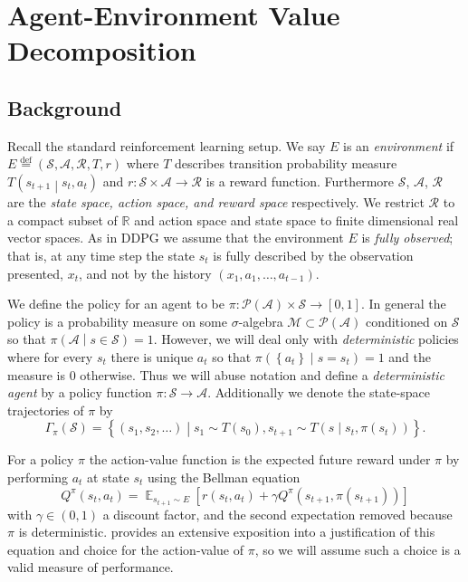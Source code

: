 \documentclass{article} %
\numberwithin{equation}{subsection}
\numberwithin{theorem}{subsection}
\def\expect{\mathop{{\mathbb{E}}}}
\newcommand{\set}[1]{ \left\{ #1 \right\} }
\def\suchthat{\mathrel{}\middle|\mathrel{}}
\def\defeq{\stackrel{\text{def}}{=}}
\def\scriptm{{\mathcal M}}
\def\scripta{{\mathcal A}}
\def\scriptr{{\mathcal R}}
\def\scriptp{{\mathcal P}}
\def\scripts{{\mathcal S}}
\begin{document}
\section{Agent-Environment Value Decomposition}


\subsection{Background}
Recall the standard reinforcement learning setup. We say $E$ is an \emph{environment} if $E \defeq (\scripts, \scripta, \scriptr, T, r)$ where $T$ describes transition probability measure $T\left(s_{t+1}\suchthat s_t, a_t\right)$ and $r: \scripts \times \scripta \to \scriptr$ is a reward function. Furthermore $\scripts$, $\scripta$, $\scriptr$ are the \emph{state space, action space, and reward space} respectively. We restrict $\scriptr$ to a compact subset of $\mathbb{R}$ and action space and state space to finite dimensional real vector spaces. As in DDPG we assume that the environment $E$ is \emph{fully observed}; that is, at any time step the state $s_t$ is fully described by the observation presented, $x_t$, and not by the history $(x_1, a_1, \dots, a_{t-1}).$

We define the policy for an agent to be $\pi: \scriptp(\scripta) \times \scripts \to [0,1]$. In general the policy is a probability measure on some $\sigma$-algebra $\scriptm \subset \scriptp(\scripta)$ conditioned on $\scripts$ so that $\pi\left(\scripta \suchthat s \in \scripts\right) = 1$. However, we will deal only with \emph{deterministic} policies where for every $s_t$ there is unique $a_t$ so that $\pi\left(\set{a_t} \suchthat s = s_t\right) = 1$ and the measure is $0$ otherwise. Thus we will abuse notation and define a \emph{deterministic agent} by a policy function $\pi: \scripts \to \scripta$. Additionally we denote the state-space trajectories of $\pi $ by
\begin{equation}
 	\Gamma_\pi(\scripts) = \set{(s_1, s_2, \dots)\suchthat s_1 \sim T(s_0), s_{t+1} \sim T\left(s \suchthat s_t, \pi(s_t)\right)}.
 \end{equation}

For a policy $\pi$  the action-value function is the expected future reward under $\pi$ by performing $a_t$ at state $s_t$ using the Bellman equation
\begin{equation}
    Q^{\pi}(s_t, a_t) = \expect_{s_{t+1} \sim E}\left[r(s_{t}, a_t) + \gamma Q^{\pi}(s_{t+1}, \pi(s_{t+1}))\right]
\end{equation}
with $\gamma \in (0,1)$ a discount factor, and the second expectation removed because $\pi$ is deterministic.  provides an extensive exposition into a justification of this equation and choice for the action-value of $\pi$, so we will assume such a choice is a valid measure of performance.
\end{document}
